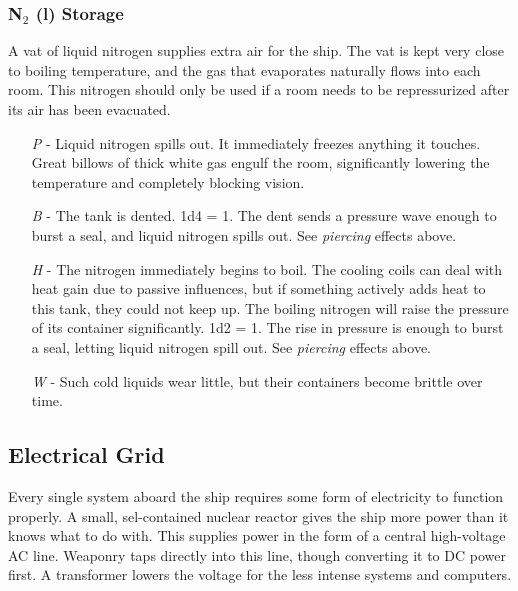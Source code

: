 \documentclass[a4paper]{article}
\begin{document}
\vspace{-0.5cm} \hspace{-18pt} \subsubsection{N$_2$ (l) Storage} \label{life_n2_storage} \vspace{-0.2cm}
A vat of liquid nitrogen supplies extra air for the ship. The vat is kept very close to boiling temperature, and the gas that evaporates naturally flows into each room. This nitrogen should only be used if a room needs to be repressurized after its air has been evacuated.
\begin{enumerate}
\item [\textit{P}] - Liquid nitrogen spills out. It immediately freezes anything it touches. Great billows of thick white gas engulf the room, significantly lowering the temperature and completely blocking vision.
\item [\textit{B}] - The tank is dented. \newline \hspace*{3pt} 1d4 = 1. The dent sends a pressure wave enough to burst a seal, and liquid nitrogen spills out. See \textit{piercing} effects above.
\item [\textit{H}] - The nitrogen immediately begins to boil. The cooling coils can deal with heat gain due to passive influences, but if something actively adds heat to this tank, they could not keep up. The boiling nitrogen will raise the pressure of its container significantly. \newline \hspace{-3pt} 1d2 = 1. The rise in pressure is enough to burst a seal, letting liquid nitrogen spill out. See \textit{piercing} effects above.
\item [\textit{W}] - Such cold liquids wear little, but their containers become brittle over time.
\end{enumerate}


\subsection{Electrical Grid} \label{grid}

Every single system aboard the ship requires some form of electricity to function properly. A small, sel-contained nuclear reactor gives the ship more power than it knows what to do with. This supplies power in the form of a central high-voltage AC line. Weaponry taps directly into this line, though converting it to DC power first. A transformer lowers the voltage for the less intense systems and computers.
\end{document}

